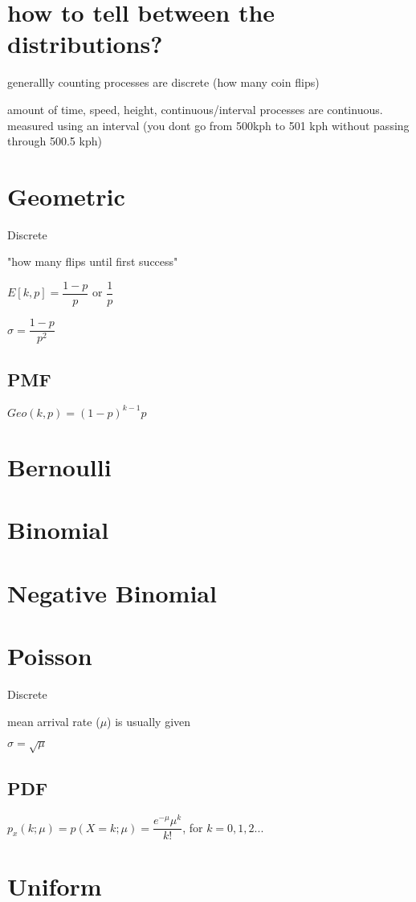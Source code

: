 \documentclass[12pt,fleqn]{article}
\begin{document}

\section{how to tell between the distributions?}

generallly counting processes are discrete (how many coin flips)

amount of time, speed, height, continuous/interval processes are continuous. measured using an interval (you dont go from 500kph to 501 kph without passing through 500.5 kph)



\section{Geometric}
Discrete

"how many flips until first success"

$E[k, p] = \dfrac{1-p}{p}$ or $\dfrac{1}{p}$

$\sigma = \dfrac{1-p}{p^2}$

\subsection{PMF}
$Geo(k, p) = (1-p)^{k-1}p$

\section{Bernoulli}
\section{Binomial}
\section{Negative Binomial}
\section{Poisson}
Discrete

mean arrival rate ($\mu$) is usually given

$\sigma = \sqrt{\mu}$

\subsection{PDF}
$p_x(k;\mu) = p(X=k; \mu) = \dfrac{e^{-\mu}\mu^k}{k!}$, for $k = 0,1,2...$
\section{Uniform}
\end{document}
